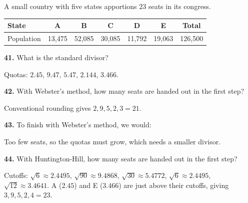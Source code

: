 \documentclass[12pt]{ximera}
\begin{document}
\begin{problem}
A small country with five states apportions $23$ seats in its congress.
\begin{center}
\begin{tabular}{l|cccccc}
State & A & B & C & D & E & Total\\\hline
Population & 13,475 & 52,085 & 30,085 & 11,792 & 19,063 & 126,500
\end{tabular}
\end{center}

\begin{prompt}
\textbf{41.} What is the standard divisor?
\begin{multipleChoice}
\end{multipleChoice}
\begin{feedback}
Quotas: $2.45$, $9.47$, $5.47$, $2.144$, $3.466$.
\end{feedback}
\end{prompt}

\begin{prompt}
\textbf{42.} With Webster's method, how many seats are handed out in the first step?
\begin{multipleChoice}
\end{multipleChoice}
\begin{feedback}
Conventional rounding gives $2,9,5,2,3=21$.
\end{feedback}
\end{prompt}

\begin{prompt}
\textbf{43.} To finish with Webster's method, we would:
\begin{multipleChoice}
\end{multipleChoice}
\begin{feedback}
Too few seats, so the quotas must grow, which needs a smaller divisor.
\end{feedback}
\end{prompt}

\begin{prompt}
\textbf{44.} With Huntington-Hill, how many seats are handed out in the first step?
\begin{multipleChoice}
\end{multipleChoice}
\begin{feedback}
Cutoffs: $\sqrt{6}\approx2.4495$, $\sqrt{90}\approx9.4868$, $\sqrt{30}\approx5.4772$, $\sqrt6\approx2.4495$, $\sqrt{12}\approx3.4641$. A ($2.45$) and E ($3.466$) are just above their cutoffs, giving $3,9,5,2,4=23$.
\end{feedback}
\end{prompt}


\end{problem}
\end{document}
